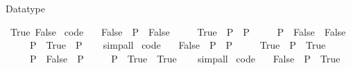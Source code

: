 \begin{isabellebody}
{\isacartoucheclose}%
\endisatagML
{\isafoldML}%
%
\isadelimML
%
\endisadelimML
%
\isadelimdocument
%
\endisadelimdocument
%
\isatagdocument
%
\isamarkuptrue%
%
\endisatagdocument
{\isafolddocument}%
%
\isadelimdocument
%
\endisadelimdocument
%
\begin{isamarkuptext}%
Datatype %
\end{isamarkuptext}\isamarkuptrue%
\isamarkupfalse%
\ True\ False\isanewline
\isanewline
{}\isamarkupfalse%
\ {\isacharbrackleft}{\kern0pt}code{\isacharbrackright}{\kern0pt}{\isacharcolon}{\kern0pt}\isanewline
\ \ \ {\isachardoublequoteopen}False\ {\isasymand}\ P\ {\isasymlongleftrightarrow}\ False{\isachardoublequoteclose}\isanewline
\ \ \ \ \ {\isachardoublequoteopen}True\ {\isasymand}\ P\ {\isasymlongleftrightarrow}\ P{\isachardoublequoteclose}\isanewline
\ \ \ \ \ {\isachardoublequoteopen}P\ {\isasymand}\ False\ {\isasymlongleftrightarrow}\ False{\isachardoublequoteclose}\isanewline
\ \ \ \ \ {\isachardoublequoteopen}P\ {\isasymand}\ True\ {\isasymlongleftrightarrow}\ P{\isachardoublequoteclose}\isanewline
%
\isadelimproof
\ \ %
\endisadelimproof
%
\isatagproof
{}\isamarkupfalse%
\ simp{\isacharunderscore}{\kern0pt}all%
\endisatagproof
{\isafoldproof}%
%
\isadelimproof
\isanewline
%
\endisadelimproof
\isanewline
{}\isamarkupfalse%
\ {\isacharbrackleft}{\kern0pt}code{\isacharbrackright}{\kern0pt}{\isacharcolon}{\kern0pt}\isanewline
\ \ \ {\isachardoublequoteopen}False\ {\isasymor}\ P\ {\isasymlongleftrightarrow}\ P{\isachardoublequoteclose}\isanewline
\ \ \ \ \ {\isachardoublequoteopen}True\ {\isasymor}\ P\ {\isasymlongleftrightarrow}\ True{\isachardoublequoteclose}\isanewline
\ \ \ \ \ {\isachardoublequoteopen}P\ {\isasymor}\ False\ {\isasymlongleftrightarrow}\ P{\isachardoublequoteclose}\isanewline
\ \ \ \ \ {\isachardoublequoteopen}P\ {\isasymor}\ True\ {\isasymlongleftrightarrow}\ True{\isachardoublequoteclose}\isanewline
%
\isadelimproof
\ \ %
\endisadelimproof
%
\isatagproof
{}\isamarkupfalse%
\ simp{\isacharunderscore}{\kern0pt}all%
\endisatagproof
{\isafoldproof}%
%
\isadelimproof
\isanewline
%
\endisadelimproof
\isanewline
{}\isamarkupfalse%
\ {\isacharbrackleft}{\kern0pt}code{\isacharbrackright}{\kern0pt}{\isacharcolon}{\kern0pt}\isanewline
\ \ \ {\isachardoublequoteopen}{\isacharparenleft}{\kern0pt}False\ {\isasymlongrightarrow}\ P{\isacharparenright}{\kern0pt}\ {\isasymlongleftrightarrow}\ True{\isachardoublequoteclose}\isanewline

\end{isabellebody}
